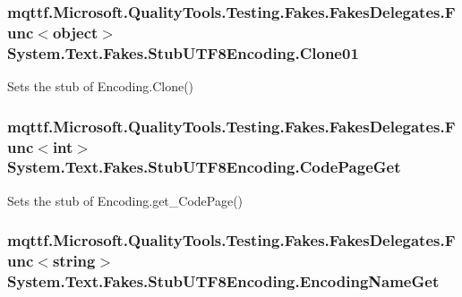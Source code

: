 \hypertarget{class_system_1_1_text_1_1_fakes_1_1_stub_u_t_f8_encoding_acda4739c5dfb9b345e88df7735fd5ebd}{
\subsubsection[{Clone01}]{\setlength{\rightskip}{0pt plus 5cm}mqttf.\-Microsoft.\-Quality\-Tools.\-Testing.\-Fakes.\-Fakes\-Delegates.\-Func$<$object$>$ System.\-Text.\-Fakes.\-Stub\-U\-T\-F8\-Encoding.\-Clone01}}\label{class_system_1_1_text_1_1_fakes_1_1_stub_u_t_f8_encoding_acda4739c5dfb9b345e88df7735fd5ebd}


Sets the stub of Encoding.\-Clone()

\hypertarget{class_system_1_1_text_1_1_fakes_1_1_stub_u_t_f8_encoding_aec879d919d12b394ca83dcadd26901bd}{
\subsubsection[{Code\-Page\-Get}]{\setlength{\rightskip}{0pt plus 5cm}mqttf.\-Microsoft.\-Quality\-Tools.\-Testing.\-Fakes.\-Fakes\-Delegates.\-Func$<$int$>$ System.\-Text.\-Fakes.\-Stub\-U\-T\-F8\-Encoding.\-Code\-Page\-Get}}\label{class_system_1_1_text_1_1_fakes_1_1_stub_u_t_f8_encoding_aec879d919d12b394ca83dcadd26901bd}


Sets the stub of Encoding.\-get\-\_\-\-Code\-Page()

\hypertarget{class_system_1_1_text_1_1_fakes_1_1_stub_u_t_f8_encoding_af17acbe97d0f3530e1888efb285e9740}{
\subsubsection[{Encoding\-Name\-Get}]{\setlength{\rightskip}{0pt plus 5cm}mqttf.\-Microsoft.\-Quality\-Tools.\-Testing.\-Fakes.\-Fakes\-Delegates.\-Func$<$string$>$ System.\-Text.\-Fakes.\-Stub\-U\-T\-F8\-Encoding.\-Encoding\-Name\-Get}}\label{class_system_1_1_text_1_1_fakes_1_1_stub_u_t_f8_encoding_af17acbe97d0f3530e1888efb285e9740}


